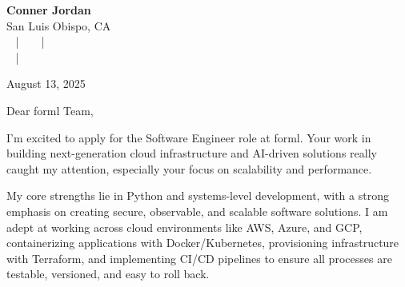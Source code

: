 \documentclass[letterpaper,11pt]{article}
\begin{document}
\begin{center}
  {\Huge \textbf{Conner Jordan}}\\[4pt]
  {\Large San Luis Obispo, CA}\\[4pt]
  \href{tel:+18059759793}{
    } ~ | ~
  \href{mailto:connercharlesjordan@gmail.com}{
    } ~ | ~
   \\
  \href{https://www.linkedin.com/in/conner-jordan-4b268514a/}{
    } ~ | ~
  \href{https://github.com/cjordan223}{
    }
\end{center}



\vspace{16pt}

\begin{flushright}
August 13, 2025
\end{flushright}



Dear forml Team,

\vspace{16pt}

I'm excited to apply for the Software Engineer role at forml. Your work in building next-generation cloud infrastructure and AI-driven solutions really caught my attention, especially your focus on scalability and performance.

\vspace{16pt}

My core strengths lie in Python and systems-level development, with a strong emphasis on creating secure, observable, and scalable software solutions. I am adept at working across cloud environments like AWS, Azure, and GCP, containerizing applications with Docker/Kubernetes, provisioning infrastructure with Terraform, and implementing CI/CD pipelines to ensure all processes are testable, versioned, and easy to roll back.

\vspace{16pt}
\end{document}
